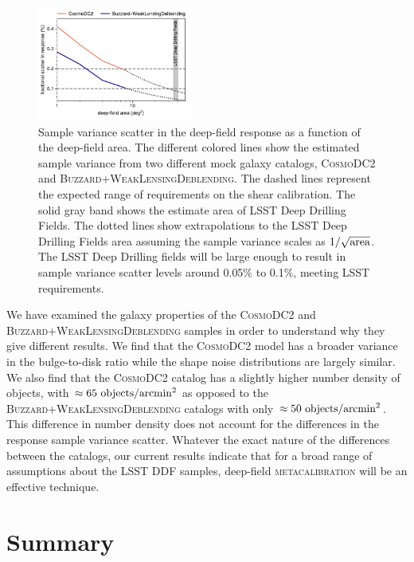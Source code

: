 \documentclass[twocolumn]{openjournal}
\makeatletter
\newcommand{\mcal}{\textsc{metacalibration}\@\xspace}
\newcommand{\descwl}{\textsc{WeakLensingDeblending}\@\xspace}
\newcommand{\cosmodctwo}{\textsc{CosmoDC2}\@\xspace}
\newcommand{\buzzard}{\textsc{Buzzard}\@\xspace}
\makeatother
\begin{document}
\begin{figure}
    \centering
    \includegraphics[width=0.45\textwidth]{sample_var.pdf}
    \caption{
      Sample variance scatter in the deep-field response as a function of the
      deep-field area. The different colored lines show the estimated sample variance
      from two different mock galaxy catalogs, \cosmodctwo and \buzzard+\descwl. The
      dashed lines represent the expected range of requirements on the shear
      calibration. The solid gray band shows the estimate area of LSST Deep Drilling
      Fields. The dotted lines show extrapolations to the LSST Deep Drilling Fields
      area assuming the sample variance scales as $1/\sqrt{\rm area}$. The LSST Deep
      Drilling fields will be large enough to result in sample variance scatter levels
      around 0.05\% to 0.1\%, meeting LSST requirements.
    }
    \label{fig:sample_variance}
    \vspace{1em}
\end{figure}

We have examined the galaxy properties of the \cosmodctwo and \buzzard+\descwl samples
in order to understand why they give different results. We find that the \cosmodctwo
model has a broader variance in the bulge-to-disk ratio while the shape noise
distributions are largely similar. We also find that the \cosmodctwo catalog has a
slightly higher number density of objects, with $\approx65\ {\rm objects}/{\rm
arcmin}^2$ as opposed to the \buzzard+\descwl catalogs with only $\approx50\ {\rm
objects}/{\rm arcmin}^2$. This difference in number density does not account for the
differences in the response sample variance scatter. Whatever the exact nature of
the differences between the catalogs, our current results indicate that for a broad
range of assumptions about the LSST DDF samples, deep-field \mcal will be an effective
technique.


\section{Summary}\label{sec:conc}
\end{document}
